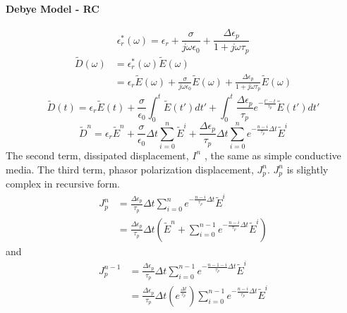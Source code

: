 \paragraph{{\msjh Debye Model - RC}}
\begin{displaymath}
  \epsilon_r^*(\omega) = \epsilon_r + \frac{\sigma}{j\omega \epsilon_0} + \frac{\Delta \epsilon_p}{1+j\omega \tau_p}
\end{displaymath}
\begin{displaymath}
  \begin{split}
    \widetilde{D}(\omega) & = \epsilon_r^*(\omega)\widetilde{E}(\omega)\\
    & = \epsilon_r\widetilde{E}(\omega) + \frac{\sigma}{j\omega\epsilon_0}\widetilde{E}(\omega) + \frac{\Delta \epsilon_p}{1+j\omega \tau_p}\widetilde{E}(\omega)
  \end{split}
\end{displaymath}
\begin{displaymath}
  \widetilde{D}(t) = \epsilon_r\widetilde{E}(t) + \frac{\sigma}{\epsilon_0}\int_0^t\widetilde{E}(t')dt' + \int_0^t\frac{\Delta \epsilon_p}{\tau_p}e^{-\frac{t'-t}{\tau_p}}\widetilde{E}(t')dt'
\end{displaymath}
\begin{equation}
  \widetilde{D}^n = \epsilon_r\widetilde{E}^n + \frac{\sigma}{\epsilon_0}\Delta t\sum_{i=0}^{n}\widetilde{E}^i + \frac{\Delta \epsilon_p}{\tau_p}\Delta t \sum_{i=0}^{n} e^{-\frac{n-i}{\tau_p}\Delta t}\widetilde{E}^i
\end{equation}
The second term, dissipated displacement, $I^n$ , the same as simple conductive media.
The third term, phasor polarization displacement, $J_p^n$. $J_p^n$ is slightly complex in recursive form.
\begin{equation}
  \begin{split}
    J_p^n & = \frac{\Delta\epsilon_p}{\tau_p}\Delta t \sum_{i=0}^ne^{-\frac{n-i}{\tau_p}\Delta t}\widetilde{E}^i\\
    & = \frac{\Delta\epsilon_p}{\tau_p}\Delta t \left(\widetilde{E}^n + \sum_{i=0}^{n-1}e^{-\frac{n-i}{\tau_p}\Delta t}\widetilde{E}^i\right)
  \end{split}
\end{equation}
and 
\begin{equation}
  \begin{split}
    J_p^{n-1} & = \frac{\Delta\epsilon_p}{\tau_p}\Delta t \sum_{i=0}^{n-1}e^{-\frac{n-1-i}{\tau_p}\Delta t}\widetilde{E}^i\\
    & = \frac{\Delta\epsilon_p}{\tau_p}\Delta t \left( e^{\frac{\Delta t}{\tau_p}} \right) \sum_{i=0}^{n-1}e^{-\frac{n-i}{\tau_p}\Delta t}\widetilde{E}^i
  \end{split}
\end{equation}
